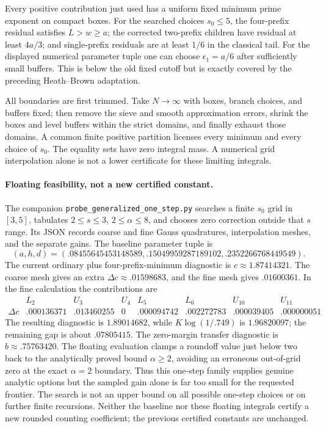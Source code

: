 Every positive contribution just used has a uniform fixed minimum
prime exponent on compact boxes. For the searched choices $s_0\le5$,
the four-prefix residual satisfies $L>w\ge a$; the corrected
two-prefix children have residual at least $4a/3$; and single-prefix
residuals are at least $1/6$ in the classical tail. For the displayed
numerical parameter tuple one can choose $\epsilon_1=a/6$ after
sufficiently small buffers. This is below the old fixed cutoff but
is exactly covered by the preceding Heath--Brown adaptation.

All boundaries are first trimmed. Take $N\to\infty$ with boxes,
branch choices, and buffers fixed; then remove the sieve and smooth
approximation errors, shrink the boxes and level buffers within the
strict domains, and finally exhaust those domains. A common finite
positive partition licenses every minimum and every choice of
$s_0$. The equality sets have zero integral mass. A numerical grid
interpolation alone is not a lower certificate for these limiting
integrals.

\paragraph{Floating feasibility, not a new certified constant.}
The companion \texttt{probe\_generalized\_one\_step.py} searches a finite
$s_0$ grid in $[3,5]$, tabulates $2\le s\le3$, $2\le\alpha\le8$,
and chooses zero correction outside that $s$ range. Its JSON records
coarse and fine Gauss quadratures, interpolation meshes, and the
separate gains. The baseline parameter tuple is
\[
 (a,h,d)=(.08455645453148589,.15049959287189102,
                           .2352266768449549).
\]
The current ordinary plus four-prefix-minimum diagnostic is
$c\approx1.87414321$. The coarse mesh gives an extra
$\Delta c\approx .01598683$, and the fine mesh gives $.01600361$.
In the fine calculation the contributions are
\[
\begin{array}{c|rrrrrrr}
 &L_2&U_3&U_4&L_5&L_6&U_{10}&U_{11}\\\hline
 \Delta c&.000136371&.013460255&0&.000094742&.002272783&
 .000039405&.000000051
\end{array}
\]
The resulting diagnostic is $1.89014682$, while $K\log(1/.749)$
is $1.96820097$; the remaining gap is about $.07805415$.
The zero-margin transfer diagnostic is $b\approx .75763420$.
The floating evaluation clamps a roundoff value just below two back
to the analytically proved bound $\alpha\ge2$, avoiding an erroneous
out-of-grid zero at the exact $\alpha=2$ boundary.
Thus this one-step family supplies genuine
analytic options but the sampled gain alone is far too small for
the requested frontier. The search is not an upper bound on all
possible one-step choices or on further finite recursions. Neither
the baseline nor these floating integrals certify a new rounded
counting coefficient; the previous certified constants are unchanged.
